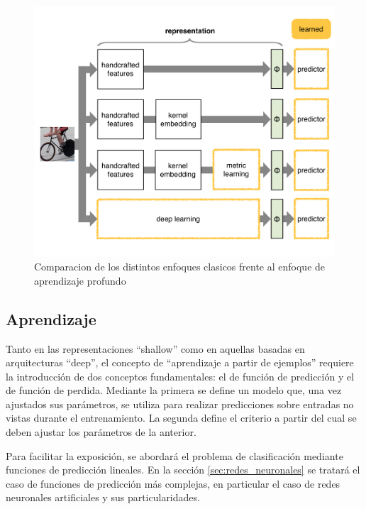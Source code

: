 \documentclass[a4paper,11pt,spanish]{book}
\begin{document}
	\begin{figure}[h]
	  \begin{center}
		  \includegraphics[width=0.9\linewidth]{./img/vedaldi_shallow_deep.pdf}
	  \caption{Comparacion de los distintos enfoques clasicos frente al enfoque de aprendizaje profundo}
	  \label{fig:shallow_deep}
	  \end{center}
	\end{figure}

        \subsection{Aprendizaje} \label{sec:aprendizaje}

	  Tanto en las representaciones ``shallow'' como en aquellas  basadas en arquitecturas ``deep'', el concepto de ``aprendizaje a
          partir de ejemplos'' requiere la introducción de dos conceptos fundamentales: el de función de predicción y el de función
          de perdida. Mediante la primera se define un modelo que, una vez ajustados sus parámetros, se utiliza para realizar predicciones sobre
          entradas no vistas durante el entrenamiento. La segunda define el criterio a partir del cual se deben ajustar los parámetros
          de la anterior. 
          
          Para facilitar la exposición, se abordará el problema de clasificación mediante funciones de predicción lineales. En la
          sección \ref{sec:redes_neuronales} se tratará el caso de funciones de predicción más complejas, en particular el caso de redes neuronales artificiales y
          sus particularidades.
\end{document}
